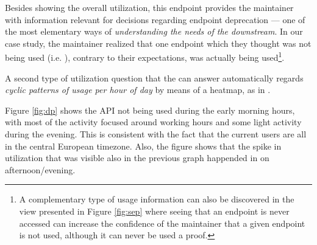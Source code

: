 \documentclass{sig-alternate-05-2015}
\begin{document}

Besides showing the overall utilization, this endpoint provides the maintainer with information relevant for decisions regarding endpoint deprecation --- one of the most elementary ways of {\em understanding the needs of the downstream}\cite{Haen14a}. In our case study, the maintainer realized that one endpoint which they thought was not being used (i.e. ), contrary to their expectations, was actually being used\footnote{A complementary type of usage information can also be discovered in the view presented in Figure \ref{fig:sep} where seeing that an endpoint is never accessed can increase the confidence of the maintainer that a given endpoint is not used, although it can never be used a proof.}.

\niceseparator


A second type of utilization question that the \tool can answer automatically regards {\em cyclic patterns of usage per hour of day} by means of a heatmap, as in . 




Figure \ref{fig:dp} shows the API not being used during the early morning hours, with most of the activity focused around working hours and some light activity during the evening. This is consistent with the fact that the current users are all in the central European timezone. Also, the figure shows that the spike in utilization that was visible also in the previous graph happended in on afternoon/evening.
\end{document}

